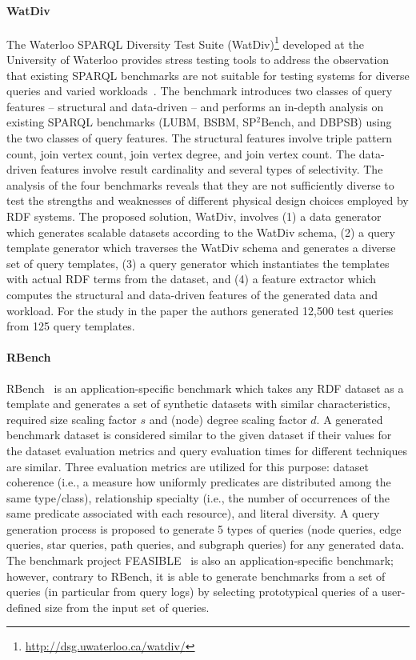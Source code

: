 \paragraph{WatDiv} The Waterloo SPARQL Diversity Test Suite (WatDiv)\footnote{\url{http://dsg.uwaterloo.ca/watdiv/}} developed at the University of Waterloo provides stress testing tools to address the observation that existing SPARQL benchmarks are not suitable for testing systems for diverse queries and varied workloads~\cite{Aluc:2014:DST:2717213.2717229}. The benchmark introduces two classes of query features -- structural and data-driven -- and performs an in-depth analysis on existing SPARQL benchmarks (LUBM, BSBM, SP$^2$Bench, and DBPSB) using the two classes of query features. The structural features involve triple pattern count, join vertex count, join vertex degree, and join vertex count. The data-driven features involve result cardinality and several types of selectivity. The analysis of the four benchmarks reveals that they are not sufficiently diverse to test the strengths and weaknesses of different physical design choices employed by RDF systems. The proposed solution, WatDiv, involves (1) a data generator which generates scalable datasets according to the WatDiv schema, (2) a query template generator which traverses the WatDiv schema and generates a diverse set of query templates, (3) a query generator which instantiates the templates with actual RDF terms from the dataset, and (4) a feature extractor which computes the structural and data-driven features of the generated data and workload. For the study in the paper the authors generated 12,500 test queries from 125 query templates.

\paragraph{RBench} RBench~\cite{Qiao:2015:RAR:2723372.2746479} is an application-specific benchmark which takes any RDF dataset as a template and generates a set of synthetic datasets with similar characteristics, required size scaling factor $s$ and (node) degree scaling factor $d$. A generated benchmark dataset is considered similar to the given dataset if their values for the dataset evaluation metrics and query evaluation times for different techniques are similar. Three evaluation metrics are utilized for this purpose: dataset coherence (i.e., a measure how uniformly predicates are distributed among the same type/class), relationship specialty (i.e., the number of occurrences of the same predicate associated with each resource), and literal diversity. A query generation process is proposed to generate 5 types of queries (node queries, edge queries, star queries, path queries, and subgraph queries) for any generated data. The benchmark project FEASIBLE~\cite{Saleem2015} is also an application-specific benchmark; however, contrary to RBench, it is able to generate benchmarks from a set of queries (in particular from query logs) by selecting prototypical queries of a user-defined
size from the input set of queries.


